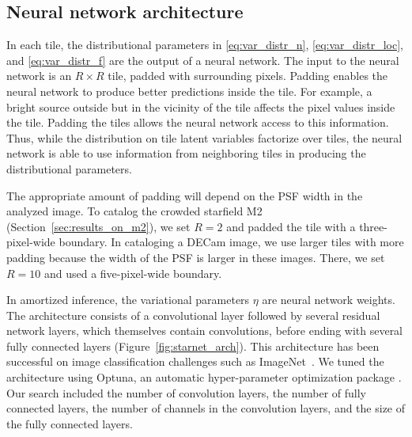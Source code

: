 \subsection{Neural network architecture}
\label{sec:nn_architecture}

In each tile, the distributional parameters in \eqref{eq:var_distr_n},
\eqref{eq:var_distr_loc}, and \eqref{eq:var_distr_f} are the output of a neural network.
The input to the neural network is an $R \times R$ tile, padded with surrounding pixels.
Padding enables the neural network to produce better predictions inside the tile.
For example, a bright source outside but in the vicinity of the tile affects the pixel values inside the tile.
Padding the tiles allows the neural network access to this information.
Thus, while the distribution on tile latent variables factorize over tiles, the neural network is able to use information from neighboring tiles in producing the distributional parameters.

The appropriate amount of padding will depend on the PSF width in the analyzed image.
To catalog the crowded starfield M2 (Section~\ref{sec:results_on_m2}),
we set $R = 2$ and padded the tile with a three-pixel-wide boundary.
In cataloging a DECam image, we use larger tiles with more padding because the width of the PSF is larger in these images. There, we set $R = 10$ and used a five-pixel-wide boundary.


In amortized inference, the variational parameters $\eta$ are neural network weights.
The architecture consists of a convolutional layer followed by several residual network layers, which themselves contain convolutions, before ending with several fully connected layers (Figure~\ref{fig:starnet_arch}).
This architecture has been successful on image classification challenges such as ImageNet~\citep{imagenet2015}.
We tuned the architecture using Optuna, an automatic hyper-parameter optimization package \citep{optuna_2019}. 
Our search included the number of convolution layers, 
the number of fully connected layers,
the number of channels in the convolution layers, and the size of the fully connected layers. 

